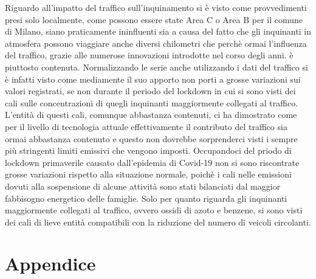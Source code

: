 \documentclass[a4paper,12pt]{report}
\begin{document}
Riguardo all'impatto del traffico sull'inquinamento si è visto come provvedimenti presi solo localmente, come possono essere state Area C o Area B per il comune di Milano, siano praticamente ininfluenti sia a causa del fatto che gli inquinanti in atmosfera possono viaggiare anche diversi chilometri che perchè ormai l'influenza del traffico, grazie alle numerose innovazioni introdotte nel corso degli anni. è piuttosto contenuta. Normalizzando le serie anche utilizzando i dati del traffico si è infatti visto come mediamente il suo apporto non porti a grosse variazioni sui valori registrati, se non durante il periodo del lockdown in cui si sono visti dei cali sulle concentrazioni di quegli inquinanti maggiormente collegati al traffico. L'entità di questi cali, comunque abbastanza contenuti, ci ha dimostrato come per il livello di tecnologia attuale effettivamente il contributo del traffico sia ormai abbastanza contenuto e questo non dovrebbe sorprenderci visti i sempre più stringenti limiti emissivi che vengono imposti.  
Occupandoci del priodo di lockdown primaverile causato dall'epidemia di Covid-19 non si sono riscontrate grosse variazioni rispetto alla situazione normale, poichè i cali nelle emissioni dovuti alla sospensione di alcune attività sono stati bilanciati dal maggior fabbisogno energetico delle famiglie. Solo per quanto riguarda gli inquinanti maggiormente collegati al traffico, ovvero ossidi di azoto e benzene, si sono visti dei cali di lieve entità compatibili con la riduzione del numero di veicoli circolanti. 


\chapter{Appendice}




{}
\end{document}
